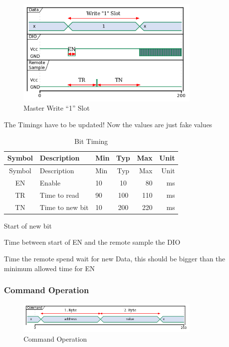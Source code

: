 \begin{figure}[htbp]
\centering
\includegraphics[width=0.80000\textwidth]{documents/images/bit_timing_1.png}
\caption{Master Write ``1'' Slot\label{bit_timing_1}}
\end{figure}

{ The Timings have to be updated! Now the values are just fake values }

\begin{longtable}[c]{@{}cllcrr@{}}
\caption{Bit Timing}\tabularnewline
\toprule
Symbol & Description & Min & Typ & Max & Unit\tabularnewline
\midrule
\endfirsthead
\toprule
Symbol & Description & Min & Typ & Max & Unit\tabularnewline
\midrule
\endhead
EN & Enable & 10 & 10 & 80 & ms\tabularnewline
TR & Time to read & 90 & 100 & 110 & ms\tabularnewline
TN & Time to new bit & 10 & 200 & 220 & ms\tabularnewline
\bottomrule
\end{longtable}

\begin{description}
\tightlist
\item[EN]
Start of new bit
\item[TR]
Time between start of EN and the remote sample the DIO
\item[TN]
Time the remote spend wait for new Data, this should be bigger than the
minimum allowed time for EN
\end{description}

\subsubsection{Command Operation}\label{command-operation}

\begin{figure}[htbp]
\centering
\includegraphics[width=0.80000\textwidth]{documents/images/command.png}
\caption{Command Operation\label{command}}
\end{figure}


